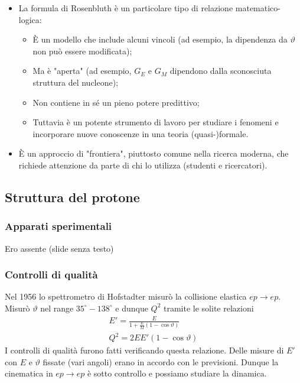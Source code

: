 \begin{itemize}
    \item La formula di Rosenbluth è un particolare tipo di relazione matematico-logica:
    \begin{itemize}
        \item È un modello che include alcuni vincoli (ad esempio, la dipendenza da $\vartheta$ non può essere modificata);
        \item Ma è "aperta" (ad esempio, $G_E$ e $G_M$ dipendono dalla sconosciuta struttura del nucleone);
        \item Non contiene in sé un pieno potere predittivo;
        \item Tuttavia è un potente strumento di lavoro per studiare i fenomeni e incorporare nuove conoscenze in una teoria (quasi-)formale.
    \end{itemize}
    \item È un approccio di "frontiera", piuttosto comune nella ricerca moderna, che richiede attenzione da parte di chi lo utilizza (studenti e ricercatori).
\end{itemize}
\subsection{Struttura del protone}
\subsubsection{Apparati sperimentali}
Ero assente (slide senza testo)
\subsubsection{Controlli di qualità}
Nel 1956 lo spettrometro di Hofstadter misurò la collisione elastica $ep\to ep$. Misurò $\vartheta$ nel range $35^\circ-138^\circ$ e dunque $Q^2$ tramite le solite relazioni
\begin{gather*}
    E'=\frac E{1+\frac EM(1-\cos\vartheta)}\\
    Q^2=2EE'(1-\cos\vartheta)
\end{gather*}
I controlli di qualità furono fatti verificando questa relazione. Delle misure di $E'$ con $E$ e $\vartheta$ fissate (vari angoli) erano in accordo con le previsioni. Dunque la cinematica in $ep\to ep$ è sotto controllo e possiamo studiare la dinamica.
